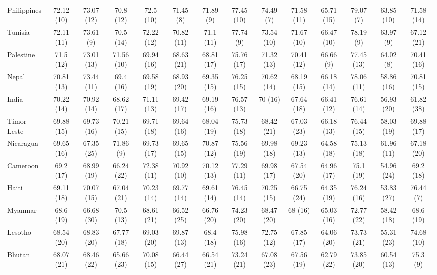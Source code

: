 {\begin{longtable}{lccccccccccccc}
Philippines & 72.12 (10) & 73.07 (12) & 70.8 (12) & 72.5 (10) & 71.45 (8) & 71.89 (9) & 77.45 (10) & 74.49 (7) & 71.58 (11) & 65.71 (15) & 79.07 (7) & 63.85 (10) & 71.58 (14) \\ 
Tunisia & 72.11 (11) & 73.61 (9) & 70.5 (14) & 72.22 (12) & 70.82 (11) & 71.1 (11) & 77.74 (9) & 73.54 (10) & 71.67 (10) & 66.47 (10) & 78.19 (9) & 63.97 (9) & 67.12 (21) \\ 
Palestine & 71.5 (12) & 73.01 (13) & 71.56 (10) & 69.94 (16) & 68.63 (21) & 68.81 (17) & 75.76 (17) & 71.32 (13) & 70.41 (12) & 66.66 (9) & 77.45 (13) & 64.02 (8) & 70.41 (16) \\ 
Nepal & 70.81 (13) & 73.44 (11) & 69.4 (16) & 69.58 (19) & 68.93 (20) & 69.35 (15) & 76.25 (15) & 70.62 (14) & 68.19 (15) & 66.18 (14) & 78.06 (11) & 58.86 (16) & 70.81 (15) \\ 
India & 70.22 (14) & 70.92 (14) & 68.62 (17) & 71.11 (13) & 69.42 (17) & 69.19 (16) & 76.57 (13) & 70 (16) & 67.64 (18) & 66.41 (12) & 76.61 (14) & 56.93 (20) & 61.82 (38) \\ 
Timor-Leste & 69.88 (15) & 69.73 (16) & 70.21 (15) & 69.71 (18) & 69.64 (16) & 68.04 (19) & 75.73 (18) & 68.42 (21) & 67.03 (23) & 66.18 (13) & 76.44 (15) & 58.03 (19) & 69.88 (17) \\ 
Nicaragua & 69.65 (16) & 67.35 (25) & 71.86 (9) & 69.73 (17) & 69.65 (15) & 70.87 (12) & 75.56 (19) & 69.98 (18) & 69.23 (13) & 64.58 (18) & 75.13 (18) & 61.96 (11) & 67.18 (20) \\ 
Cameroon & 69.2 (17) & 68.99 (19) & 66.24 (22) & 72.38 (11) & 70.92 (10) & 70.12 (13) & 77.29 (11) & 69.98 (17) & 67.54 (20) & 64.96 (17) & 75.1 (19) & 54.96 (24) & 69.2 (18) \\ 
Haiti & 69.11 (18) & 70.07 (15) & 67.04 (21) & 70.23 (14) & 69.77 (14) & 69.61 (14) & 76.45 (14) & 70.25 (15) & 66.75 (24) & 64.35 (19) & 76.24 (16) & 53.83 (27) & 76.44 (7) \\ 
Myanmar & 68.6 (19) & 66.68 (30) & 70.5 (13) & 68.61 (21) & 66.52 (25) & 66.76 (20) & 74.23 (20) & 68.47 (20) & 68 (16) & 65.03 (16) & 72.77 (22) & 58.42 (18) & 68.6 (19) \\ 
Lesotho & 68.54 (20) & 68.83 (20) & 67.77 (18) & 69.03 (20) & 69.87 (13) & 68.4 (18) & 75.98 (16) & 72.75 (12) & 67.85 (17) & 64.06 (20) & 73.73 (21) & 55.31 (23) & 74.68 (10) \\ 
Bhutan & 68.07 (21) & 68.46 (22) & 65.66 (23) & 70.08 (15) & 66.44 (27) & 66.54 (21) & 73.24 (21) & 67.08 (23) & 67.56 (19) & 62.79 (22) & 73.85 (20) & 60.54 (13) & 75.3 (9) \\ 

\end{longtable}}
